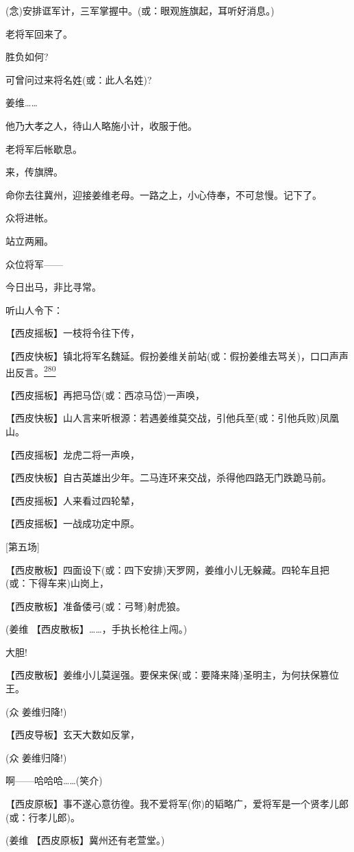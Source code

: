 (念)安排诓军计，三军掌握中。(或：眼观旌旗起，耳听好消息。)

老将军回来了。

胜负如何?

可曾问过来将名姓(或：此人名姓)?

姜维\ldots{}\ldots{}

他乃大孝之人，待山人略施小计，收服于他。

老将军后帐歇息。

来，传旗牌。

命你去往冀州，迎接姜维老母。一路之上，小心侍奉，不可怠慢。记下了。

众将进帐。

站立两厢。

众位将军------

今日出马，非比寻常。

听山人令下：

【西皮摇板】一枝将令往下传，

【西皮快板】镇北将军名魏延。假扮姜维关前站(或：假扮姜维去骂关)，口口声声出反言。\protect\hyperlink{fn280}{\textsuperscript{280}}

【西皮摇板】再把马岱(或：西凉马岱)一声唤，

【西皮快板】山人言来听根源：若遇姜维莫交战，引他兵至(或：引他兵败)凤凰山。

【西皮摇板】龙虎二将一声唤，

【西皮快板】自古英雄出少年。二马连环来交战，杀得他四路无门跌跪马前。

【西皮摇板】人来看过四轮辇，

【西皮摇板】一战成功定中原。

{[}第五场{]}

【西皮散板】四面设下(或：四下安排)天罗网，姜维小儿无躲藏。四轮车且把(或：下得车来)山岗上，

【西皮散板】准备倭弓(或：弓弩)射虎狼。

(姜维 【西皮散板】\ldots{}\ldots{}，手执长枪往上闯。)

大胆!

【西皮散板】姜维小儿莫逞强。要保来保(或：要降来降)圣明主，为何扶保篡位王。

(众 姜维归降!)

【西皮导板】玄天大数如反掌，

(众 姜维归降!)

啊------哈哈哈\ldots{}\ldots{}(笑介)

【西皮原板】事不遂心意彷徨。我不爱将军(你)的韬略广，爱将军是一个贤孝儿郎(或：行孝儿郎)。

(姜维 【西皮原板】冀州还有老萱堂。)

